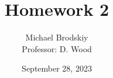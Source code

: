 


\title{Homework 2}
\date{September 28, 2023}
\author{Michael Brodskiy\\ \small Professor: D. Wood}



\maketitle

